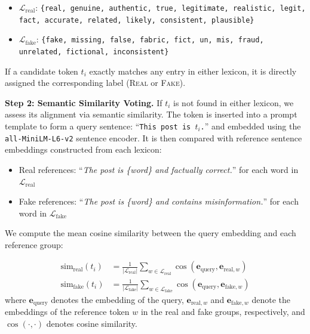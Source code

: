 \begin{itemize}[leftmargin=4mm]
    \item $\mathcal{L}_{\text{real}}$: \texttt{\{real, genuine, authentic, true, legitimate, realistic, legit, fact, accurate, related, likely, consistent, plausible\}}
    \item $\mathcal{L}_{\text{fake}}$: \texttt{\{fake, missing, false, fabric,  fict, un, mis, fraud, unrelated, fictional, inconsistent\}}
\end{itemize}


If a candidate token $t_i$ exactly matches any entry in either lexicon, it is directly assigned the corresponding label (\textsc{Real} or \textsc{Fake}).

\vspace{1mm}
\noindent\textbf{Step 2: Semantic Similarity Voting.} If $t_i$ is not found in either lexicon, we assess its alignment via semantic similarity. The token is inserted into a prompt template to form a query sentence: ``\texttt{This post is $t_i$.}'' and embedded using the \texttt{all-MiniLM-L6-v2} sentence encoder. It is then compared with reference sentence embeddings constructed from each lexicon:

\begin{itemize}[leftmargin=3mm]
    \item Real references: ``\textit{The post is \{word\} and factually correct.}'' for each word in $\mathcal{L}_{\text{real}}$
    \item Fake references: ``\textit{The post is \{word\} and contains misinformation.}'' for each word in $\mathcal{L}_{\text{fake}}$
\end{itemize}

We compute the mean cosine similarity between the query embedding and each reference group:

\begin{align}
\text{sim}_{\text{real}}(t_i) &= \frac{1}{|\mathcal{L}_{\text{real}}|} \sum_{w \in \mathcal{L}_{\text{real}}} \cos(\mathbf{e}_{\text{query}}, \mathbf{e}_{\text{real}, w}) \\
\text{sim}_{\text{fake}}(t_i) &= \frac{1}{|\mathcal{L}_{\text{fake}}|} \sum_{w \in \mathcal{L}_{\text{fake}}} \cos(\mathbf{e}_{\text{query}}, \mathbf{e}_{\text{fake}, w})
\end{align}
where $\mathbf{e}_{\text{query}}$ denotes the embedding of the query, $\mathbf{e}_{\text{real}, w}$ and $\mathbf{e}_{\text{fake}, w}$ denote the embeddings of the reference token $w$ in the real and fake groups, respectively, and $\cos(\cdot,\cdot)$ denotes cosine similarity.

